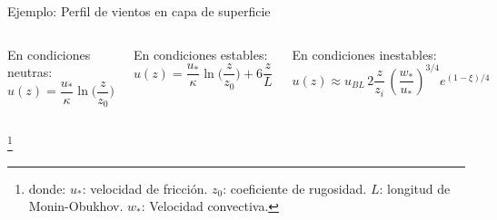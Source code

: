 \begin{frame}{Ejemplo: Perfil de vientos en capa de superficie}

\begin{columns}

En condiciones \alert{neutras}:
$$
u(z) = \frac{u_*}{\kappa} \ln\bigg(\frac{z}{z_0}\bigg)
$$

En condiciones \alert{estables}:%
$$
u(z) = \frac{u_*}{\kappa} \ln\bigg(\frac{z}{z_0}\bigg) + 6 \dfrac{z}{L}
$$

En condiciones \alert{inestables}:%
$$
u(z)\approx u_{BL}\, 2\frac{z}{z_i}\,(\frac{w_*}{u_*})^{3/4} e^{(1-\xi)/4}
$$

   \includegraphics[width=\textwidth]{img/SL_wind.png}  
\end{columns}
 \footnote{donde: $u_*$: velocidad de fricción. $z_0$: coeficiente de rugosidad. $L$: longitud de Monin-Obukhov. $w_*$: Velocidad convectiva.}   
\end{frame}

